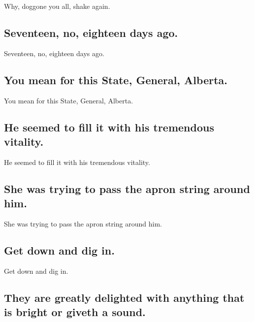 \documentclass[]{article}
\begin{document}
Why, doggone you all, shake again.

\hypertarget{seventeen-no-eighteen-days-ago.}{%
\subsection{Seventeen, no, eighteen days
ago.}\label{seventeen-no-eighteen-days-ago.}}

Seventeen, no, eighteen days ago.

\hypertarget{you-mean-for-this-state-general-alberta.}{%
\subsection{You mean for this State, General,
Alberta.}\label{you-mean-for-this-state-general-alberta.}}

You mean for this State, General, Alberta.

\hypertarget{he-seemed-to-fill-it-with-his-tremendous-vitality.}{%
\subsection{He seemed to fill it with his tremendous
vitality.}\label{he-seemed-to-fill-it-with-his-tremendous-vitality.}}

He seemed to fill it with his tremendous vitality.

\hypertarget{she-was-trying-to-pass-the-apron-string-around-him.}{%
\subsection{She was trying to pass the apron string around
him.}\label{she-was-trying-to-pass-the-apron-string-around-him.}}

She was trying to pass the apron string around him.

\hypertarget{get-down-and-dig-in.}{%
\subsection{Get down and dig in.}\label{get-down-and-dig-in.}}

Get down and dig in.

\hypertarget{they-are-greatly-delighted-with-anything-that-is-bright-or-giveth-a-sound.}{%
\subsection{They are greatly delighted with anything that is bright or
giveth a
sound.}\label{they-are-greatly-delighted-with-anything-that-is-bright-or-giveth-a-sound.}}
\end{document}
